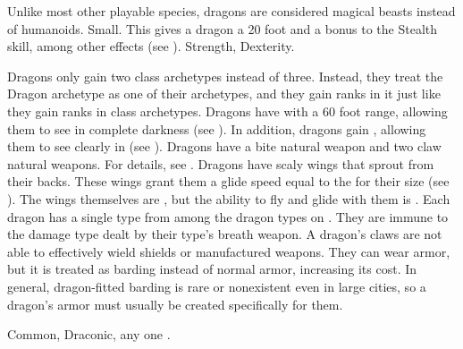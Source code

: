          Unlike most other playable species, dragons are considered magical beasts instead of humanoids.
         Small. This gives a dragon a 20 foot  and a  bonus to the Stealth skill, among other effects (see ).
          Strength,  Dexterity.
        \begin{itemize}
             Dragons only gain two class archetypes instead of three.
                Instead, they treat the Dragon archetype as one of their archetypes, and they gain ranks in it just like they gain ranks in class archetypes.
             Dragons have  with a 60 foot range, allowing them to see in complete darkness (see ).
                In addition, dragons gain , allowing them to see clearly in  (see ).
             Dragons have a bite natural weapon and two claw natural weapons.
                For details, see .
             Dragons have scaly wings that sprout from their backs.
                These wings grant them a glide speed equal to the  for their size (see ).
                The wings themselves are , but the ability to fly and glide with them is \magical.
             Each dragon has a single type from among the dragon types on .
                They are immune to the damage type dealt by their type's breath weapon.
             A dragon's claws are not able to effectively wield shields or manufactured weapons.
                They can wear armor, but it is treated as barding instead of normal armor, increasing its cost.
                In general, dragon-fitted barding is rare or nonexistent even in large cities, so a dragon's armor must usually be created specifically for them.
        \end{itemize}
         Common, Draconic, any one .

